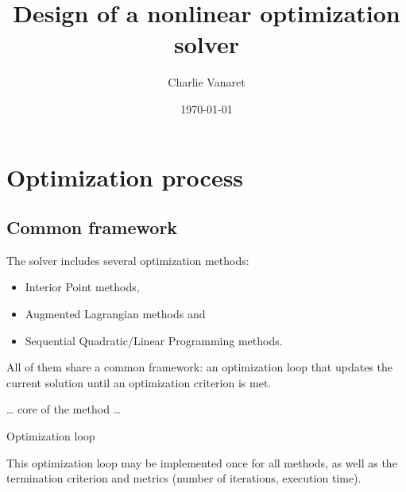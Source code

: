 \documentclass[11pt,twoside]{book}
\title{Design of a nonlinear optimization solver}
\author{Charlie Vanaret}
\date{\today}
\begin{document}
\maketitle

\tableofcontents

\chapter{Optimization process}

\section{Common framework}

The solver includes several optimization methods:

\begin{itemize}
\item Interior Point methods,
\item Augmented Lagrangian methods and
\item Sequential Quadratic/Linear Programming methods.
\end{itemize}

All of them share a common framework: an optimization loop that updates
the current solution until an optimization criterion is met.

\begin{algorithm}[H]
 {
	\ldots \;
	core of the method \;
	\ldots \;
}
\caption{Optimization loop}
\end{algorithm}

This optimization loop may be implemented once for all methods, as well
as the termination criterion and metrics (number of iterations,
execution time).

\end{document}
